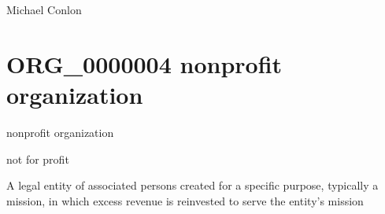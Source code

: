 \documentclass[letterpaper,10pt,english]{sphinxmanual}
\begin{document}
\begin{sphinxShadowBox}

\sphinxAtStartPar
{}
\end{sphinxShadowBox}

\begin{sphinxShadowBox}

\sphinxAtStartPar
Michael Conlon 
\end{sphinxShadowBox}
\begin{quote}
\label{\detokenize{doc-ORG_0000004:org-0000004}}\label{\detokenize{doc-ORG_0000004:non-profit-organization}}\label{\detokenize{doc-ORG_0000004:org-0000004}}
\ignorespaces \end{quote}


\section{ORG\_0000004 \sphinxhyphen{} non\sphinxhyphen{}profit organization}
\label{\detokenize{doc-ORG_0000004:org-0000004-non-profit-organization}}\label{\detokenize{doc-ORG_0000004:index-0}}\label{\detokenize{doc-ORG_0000004::doc}}
\begin{sphinxShadowBox}

\sphinxAtStartPar
non\sphinxhyphen{}profit organization
\end{sphinxShadowBox}

\begin{sphinxShadowBox}

\sphinxAtStartPar
not for profit
\end{sphinxShadowBox}

\begin{sphinxShadowBox}

\sphinxAtStartPar
A legal entity of associated persons created for a specific purpose, typically a mission, in which excess revenue is reinvested to serve the entity’s mission
\end{sphinxShadowBox}
\end{document}
